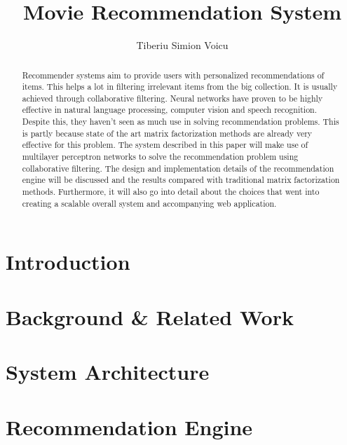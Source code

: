 \documentclass[12pt]{elsarticle}
\begin{document}
\begin{frontmatter}

\title{Movie Recommendation System}

\author{Tiberiu Simion Voicu}

\address{Post graduate thesis project, ECS751P}

\begin{abstract}
    Recommender systems aim to provide users with personalized recommendations of items. This helps a lot in filtering irrelevant items from the big collection. It is usually achieved through collaborative filtering. 
    Neural networks have proven to be highly effective in natural language processing, computer vision and speech recognition. Despite this, they haven't seen as much use in solving recommendation problems. This is partly because state of the art matrix factorization methods are already very effective for this problem. The system described in this paper will make use of multilayer perceptron networks to solve the recommendation problem using collaborative filtering. The design and implementation details of the recommendation engine will be discussed and the results compared with traditional matrix factorization methods. Furthermore, it will also go into detail about the choices that went into creating a scalable overall system and accompanying web application.
\end{abstract}

\end{frontmatter}

\newpage
\tableofcontents

\section{Introduction}


\section{Background \& Related Work}


\section{System Architecture}



\section{Recommendation Engine}

\end{document}
